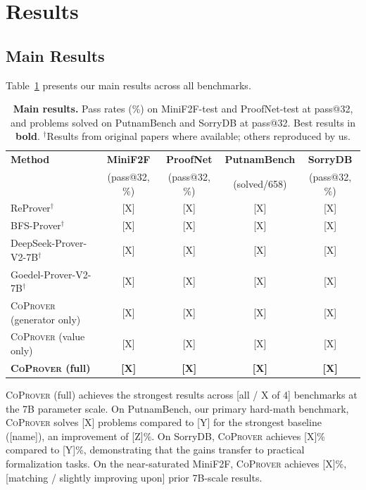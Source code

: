 \documentclass{article}
\newcommand{\coprover}{\textsc{CoProver}}
\begin{document}
\section{Results}
\label{sec:results}

\subsection{Main Results}

Table~\ref{tab:main} presents our main results across all benchmarks.

\begin{table}[t]
\centering
\caption{\textbf{Main results.} Pass rates (\%) on MiniF2F-test and ProofNet-test at pass@32, and problems solved on PutnamBench and SorryDB at pass@32. Best results in \textbf{bold}. $^\dagger$Results from original papers where available; others reproduced by us.}
\label{tab:main}
\vspace{0.5em}
\begin{tabular}{lcccc}
\toprule
\textbf{Method} & \textbf{MiniF2F} & \textbf{ProofNet} & \textbf{PutnamBench} & \textbf{SorryDB} \\
 & (pass@32, \%) & (pass@32, \%) & (solved/658) & (pass@32, \%) \\
\midrule
ReProver$^\dagger$ & [X] & [X] & [X] & [X] \\
BFS-Prover$^\dagger$ & [X] & [X] & [X] & [X] \\
DeepSeek-Prover-V2-7B$^\dagger$ & [X] & [X] & [X] & [X] \\
Goedel-Prover-V2-7B$^\dagger$ & [X] & [X] & [X] & [X] \\
\midrule
\coprover{} (generator only) & [X] & [X] & [X] & [X] \\
\coprover{} (value only) & [X] & [X] & [X] & [X] \\
\textbf{\coprover{} (full)} & \textbf{[X]} & \textbf{[X]} & \textbf{[X]} & \textbf{[X]} \\
\bottomrule
\end{tabular}
\end{table}

\coprover{} (full) achieves the strongest results across [all / X of 4] benchmarks at the 7B parameter scale. On PutnamBench, our primary hard-math benchmark, \coprover{} solves [X] problems compared to [Y] for the strongest baseline ([name]), an improvement of [Z]\%. On SorryDB, \coprover{} achieves [X]\% compared to [Y]\%, demonstrating that the gains transfer to practical formalization tasks. On the near-saturated MiniF2F, \coprover{} achieves [X]\%, [matching / slightly improving upon] prior 7B-scale results.
\end{document}
